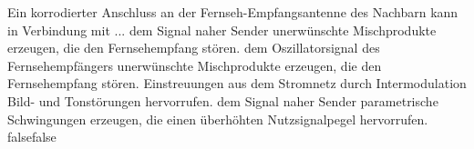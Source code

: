     {Ein korrodierter Anschluss an der Fernseh-Empfangsantenne des Nachbarn kann in Verbindung mit ...}
    { dem Signal naher Sender unerwünschte Mischprodukte erzeugen, die den Fernsehempfang stören.}
    { dem Oszillatorsignal des Fernsehempfängers unerwünschte Mischprodukte erzeugen, die den Fernsehempfang stören.}
    { Einstreuungen aus dem Stromnetz durch Intermodulation Bild- und Tonstörungen hervorrufen.}
    {dem Signal naher Sender parametrische Schwingungen erzeugen, die einen überhöhten Nutzsignalpegel hervorrufen.}
    {false}{false}